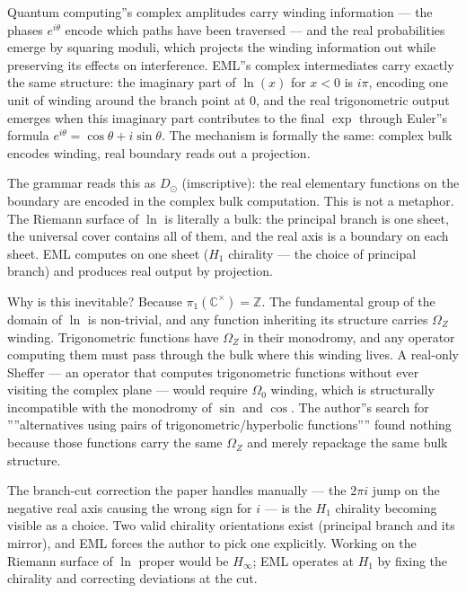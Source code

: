 \documentclass[12pt,a4paper]{article}
\begin{document}
Quantum computing''s complex amplitudes carry winding information --- the phases
$e^{i\theta}$ encode which paths have been traversed --- and the real probabilities
emerge by squaring moduli, which projects the winding information out while
preserving its effects on interference. EML''s complex intermediates carry exactly
the same structure: the imaginary part of $\ln(x)$ for $x < 0$ is $i\pi$,
encoding one unit of winding around the branch point at $0$, and the real
trigonometric output emerges when this imaginary part contributes to the final
$\exp$ through Euler''s formula $e^{i\theta} = \cos\theta + i\sin\theta$. The
mechanism is formally the same: complex bulk encodes winding, real boundary reads
out a projection.

The grammar reads this as $D_{\odot}$ (imscriptive): the real elementary functions
on the boundary are encoded in the complex bulk computation. This is not a
metaphor. The Riemann surface of $\ln$ is literally a bulk: the principal branch
is one sheet, the universal cover contains all of them, and the real axis is a
boundary on each sheet. EML computes on one sheet ($H_1$ chirality --- the choice
of principal branch) and produces real output by projection.

Why is this inevitable? Because $\pi_1(\mathbb{C}^\times) = \mathbb{Z}$. The
fundamental group of the domain of $\ln$ is non-trivial, and any function
inheriting its structure carries $\Omega_Z$ winding. Trigonometric functions have
$\Omega_Z$ in their monodromy, and any operator computing them must pass through
the bulk where this winding lives. A real-only Sheffer --- an operator that computes
trigonometric functions without ever visiting the complex plane --- would require
$\Omega_0$ winding, which is structurally incompatible with the monodromy of
$\sin$ and $\cos$. The author''s search for ''''alternatives using pairs of
trigonometric/hyperbolic functions'''' found nothing because those functions carry
the same $\Omega_Z$ and merely repackage the same bulk structure.

The branch-cut correction the paper handles manually --- the $2\pi i$ jump on the
negative real axis causing the wrong sign for $i$ --- is the $H_1$ chirality
becoming visible as a choice. Two valid chirality orientations exist (principal
branch and its mirror), and EML forces the author to pick one explicitly. Working
on the Riemann surface of $\ln$ proper would be $H_{\infty}$; EML operates at $H_1$
by fixing the chirality and correcting deviations at the cut.
\end{document}
